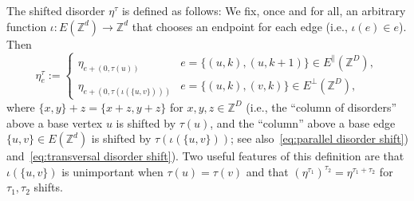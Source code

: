 \documentclass[11pt, reqno]{amsart}
\newcommand{\Z}{\mathbb{Z}}
\numberwithin{equation}{section}
\begin{document}
The shifted disorder $\eta^\tau$ is defined as follows: We fix, once and for all, an arbitrary function $\iota:E(\Z^d)\to\Z^d$ that chooses an endpoint for each edge (i.e., $\iota(e)\in e$). Then
\begin{equation}
\eta^\tau_e:=\begin{cases}\eta_{e+(0,\tau(u))}&e = \{(u,k),(u,k+1)\}\in E^\parallel(\Z^D),\\
\eta_{e+(0,\tau(\iota(\{u,v\})))}&e = \{(u,k),(v,k)\}\in E^\perp(\Z^D),
\end{cases}
\end{equation}
where $\{x,y\}+z=\{x+z,y+z\}$ for $x,y,z\in\Z^D$
(i.e., the ``column of disorders'' above a base vertex $u$ is shifted by $\tau(u)$, and the ``column'' above a base edge $\{u,v\}\in E(\Z^d)$ is shifted by $\tau(\iota(\{u,v\}))$; see also~\eqref{eq:parallel disorder shift}) and~\eqref{eq:transversal disorder shift}). Two useful features of this definition are that $\iota(\{u,v\})$ is unimportant when $\tau(u)=\tau(v)$ and that $(\eta^{\tau_1})^{\tau_2}=\eta^{\tau_1+\tau_2}$ for $\tau_1,\tau_2$ shifts.
\end{document}
